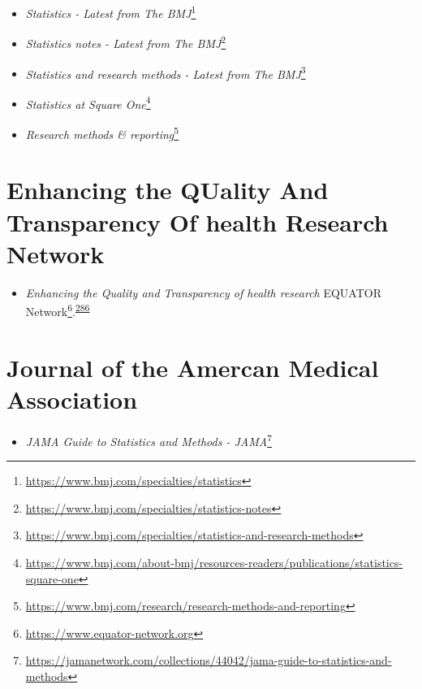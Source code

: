 \documentclass[
  a4paper,
]{book}
\providecommand{\tightlist}{%
  \setlength{\itemsep}{0pt}\setlength{\parskip}{0pt}}
\renewcommand{\href}[2]{#2\footnote{\url{#1}}}
\begin{document}
\begin{itemize}
\item
  \href{https://www.bmj.com/specialties/statistics}{\emph{Statistics - Latest from The BMJ}}
\item
  \href{https://www.bmj.com/specialties/statistics-notes}{\emph{Statistics notes - Latest from The BMJ}}
\item
  \href{https://www.bmj.com/specialties/statistics-and-research-methods}{\emph{Statistics and research methods - Latest from The BMJ}}
\item
  \href{https://www.bmj.com/about-bmj/resources-readers/publications/statistics-square-one}{\emph{Statistics at Square One}}
\item
  \href{https://www.bmj.com/research/research-methods-and-reporting}{\emph{Research methods \& reporting}}
\end{itemize}

\hypertarget{enhancing-the-quality-and-transparency-of-health-research-network}{%
\section*{Enhancing the QUality And Transparency Of health Research Network}\label{enhancing-the-quality-and-transparency-of-health-research-network}}

\begin{itemize}
\tightlist
\item
  \emph{Enhancing the Quality and Transparency of health research} \href{https://www.equator-network.org}{EQUATOR Network}.\textsuperscript{\protect\hyperlink{ref-Altman2008}{286}}
\end{itemize}

\hypertarget{journal-of-the-amercan-medical-association}{%
\section*{Journal of the Amercan Medical Association}\label{journal-of-the-amercan-medical-association}}

\begin{itemize}
\tightlist
\item
  \href{https://jamanetwork.com/collections/44042/jama-guide-to-statistics-and-methods}{\emph{JAMA Guide to Statistics and Methods - JAMA}}
\end{itemize}
\end{document}
